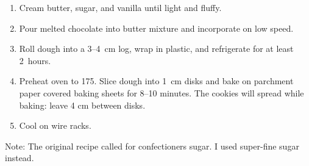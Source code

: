 
\begin{ingredients}
\end{ingredients}


\begin{recipe}
  \begin{enumerate}

  \item Cream butter, sugar, and vanilla until light and fluffy.

  \item Pour melted chocolate into butter mixture and incorporate on
    low speed.

  \item Roll dough into a 3--4~cm log, wrap in plastic, and
    refrigerate for at least 2~hours.

  \item Preheat oven to 175\degreeC.  Slice dough into 1~cm disks and
    bake on parchment paper covered baking sheets for 8--10 minutes.
    The cookies will spread while baking: leave 4 cm between disks.

  \item Cool on wire racks.

  \end{enumerate}
\end{recipe}

Note: The original recipe called for confectioners sugar.  I used
super-fine sugar instead.

